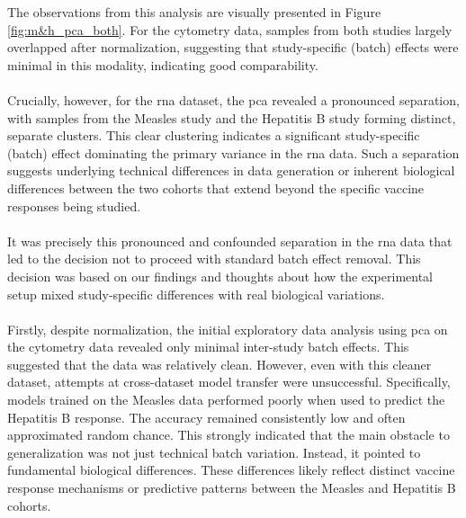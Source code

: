 \documentclass[12pt,a4paper]{report}
\begin{document}
\noindent
The observations from this analysis are visually presented in Figure \ref{fig:m&h_pca_both}. For the cytometry data, samples from both studies largely overlapped after normalization, suggesting that study-specific (batch) effects were minimal in this modality, indicating good comparability.\\
\\
Crucially, however, for the \acrshort{rna} dataset, the \gls{pca} revealed a pronounced separation, with samples from the Measles study and the Hepatitis B study forming distinct, separate clusters. This clear clustering indicates a significant study-specific (batch) effect dominating the primary variance in the \acrshort{rna} data. Such a separation suggests underlying technical differences in data generation or inherent biological differences between the two cohorts that extend beyond the specific vaccine responses being studied.\\
\\
It was precisely this pronounced and confounded separation in the \acrshort{rna} data that led to the decision not to proceed with standard batch effect removal. This decision was based on our findings and thoughts about how the experimental setup mixed study-specific differences with real biological variations.\\
\\
Firstly, despite normalization, the initial exploratory data analysis using \acrfull{pca} on the cytometry data revealed only minimal inter-study batch effects. This suggested that the data was relatively clean. However, even with this cleaner dataset, attempts at cross-dataset model transfer were unsuccessful. Specifically, models trained on the Measles data performed poorly when used to predict the Hepatitis B response. The accuracy remained consistently low and often approximated random chance. This strongly indicated that the main obstacle to generalization was not just technical batch variation. Instead, it pointed to fundamental biological differences. These differences likely reflect distinct vaccine response mechanisms or predictive patterns between the Measles and Hepatitis B cohorts.\\
\\
\end{document}
